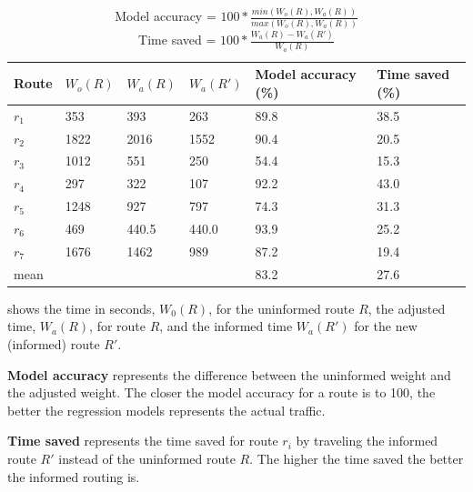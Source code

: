\begin{table}[H]
\centering
\begin{tabular}{llllll}
\textbf{Route} & \textbf{$W_o(R)$} & \textbf{$W_a(R)$}  & \textbf{$W_a(R')$} & \textbf{Model accuracy (\%)} & \textbf{Time saved (\%)} \\ \hline
$r_1$          & 353               & 393                & 263                & 89.8                         & 38.5 \\
$r_2$          & 1822              & 2016               & 1552               & 90.4                         & 20.5 \\
$r_3$          & 1012              & 551                & 250                & 54.4                         & 15.3 \\
$r_4$          & 297               & 322                & 107                & 92.2                         & 43.0 \\
$r_5$          & 1248              & 927                & 797                & 74.3                         & 31.3 \\
$r_6$          & 469               & 440.5              & 440.0              & 93.9                         & 25.2 \\
$r_7$          & 1676              & 1462               & 989                & 87.2                         & 19.4 \\ \hline
mean       	   &                   &                    &                    & 83.2                         & 27.6
\end{tabular}
\caption{Model accuracy = $100 * \frac{min(W_o(R), W_a(R))}{max(W_o(R), W_a(R))}$\\
	     Time saved = $100 * \frac{W_a(R) - W_a(R')}{W_a(R)}$}
\label{tab:eval-results}
\end{table}

 shows the time in seconds, $W_0(R)$, for the uninformed route $R$, the adjusted time, $W_a(R)$, for route $R$, and the informed time $W_a(R')$ for the new (informed) route $R'$.

\textbf{Model accuracy} represents the difference between the uninformed weight and the adjusted weight. The closer the model accuracy for a route is to 100, the better the regression models represents the actual traffic.

\textbf{Time saved} represents the time saved for route $r_i$ by traveling the informed route $R'$ instead of the uninformed route $R$. The higher the time saved the better the informed routing is.

